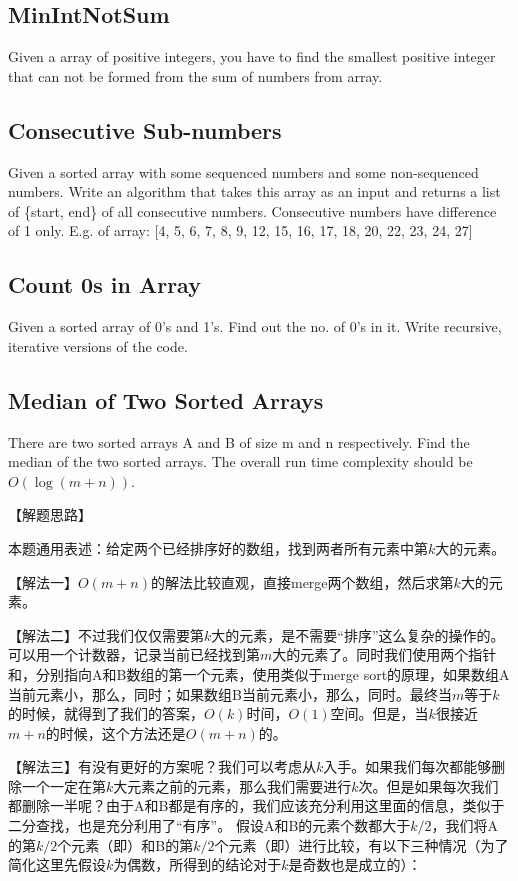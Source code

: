 \subsection{MinIntNotSum}
Given a array of positive integers, you have to find the smallest positive integer that can not be formed from the sum of numbers from array.

\subsection{Consecutive Sub-numbers}
Given a sorted array with some sequenced numbers and some non-sequenced numbers. Write an algorithm that takes this array as an input and returns a list of \{start, end\} of all consecutive numbers. Consecutive numbers have difference of 1 only.
E.g. of array:
[4, 5, 6, 7, 8, 9, 12, 15, 16, 17, 18, 20, 22, 23, 24, 27]

\subsection{Count 0s in Array}
Given a sorted array of 0’s and 1’s. Find out the no. of 0’s in it. Write recursive, iterative versions of the code.

\subsection{Median of Two Sorted Arrays}
\label{sec:median-of-two-sorted-arrays}



There are two sorted arrays A and B of size m and n respectively. Find the
median of the two sorted arrays. The overall run time complexity should be
$O(\log (m+n))$.


【解题思路】

本题通用表述：给定两个已经排序好的数组，找到两者所有元素中第$k$大的元素。

【解法一】$O(m+n)$的解法比较直观，直接merge两个数组，然后求第$k$大的元素。

【解法二】不过我们仅仅需要第$k$大的元素，是不需要“排序”这么复杂的操作的。可以用一个计数器，记录当前已经找到第$m$大的元素了。同时我们使用两个指针和，分别指向A和B数组的第一个元素，使用类似于merge
sort的原理，如果数组A当前元素小，那么，同时；如果数组B当前元素小，那么，同时。最终当$m$等于$k$的时候，就得到了我们的答案，$O(k)$时间，$O(1)$空间。但是，当$k$很接近$m+n$的时候，这个方法还是$O(m+n)$的。

【解法三】有没有更好的方案呢？我们可以考虑从$k$入手。如果我们每次都能够删除一个一定在第$k$大元素之前的元素，那么我们需要进行$k$次。但是如果每次我们都删除一半呢？由于A和B都是有序的，我们应该充分利用这里面的信息，类似于二分查找，也是充分利用了“有序”。
假设A和B的元素个数都大于$k/2$，我们将A的第$k/2$个元素（即）和B的第$k/2$个元素（即）进行比较，有以下三种情况（为了简化这里先假设$k$为偶数，所得到的结论对于$k$是奇数也是成立的）：
\begindot
\item {}
\item {}
\item {}
\myenddot

